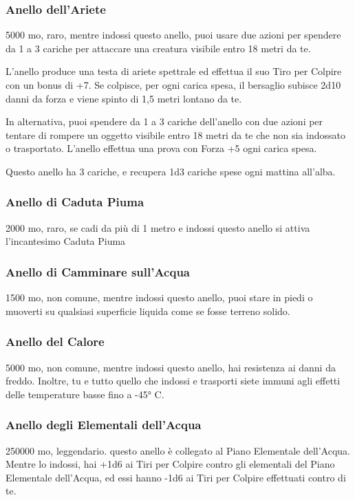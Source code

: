 \begin{multicols}{2}
	\subsubsection*{Anello dell'Ariete}
	5000 mo, raro, mentre indossi questo anello, puoi usare due azioni per spendere da 1 a 3 cariche per attaccare una creatura visibile entro 18 metri da te.

	L'anello produce una testa di ariete spettrale ed effettua il suo Tiro per Colpire con un bonus di +7. Se colpisce, per ogni carica spesa, il bersaglio subisce 2d10 danni da forza e viene spinto di 1,5 metri lontano da te.

	In alternativa, puoi spendere da 1 a 3 cariche dell'anello con due azioni per tentare di rompere un oggetto visibile entro 18 metri da te che non sia indossato o trasportato. L'anello effettua una prova con Forza +5 ogni carica spesa.

	Questo anello ha 3 cariche, e recupera 1d3 cariche spese ogni mattina all'alba.

	\subsubsection*{Anello di Caduta Piuma}
	2000 mo, raro, se cadi da più di 1 metro e indossi questo anello si attiva l'incantesimo Caduta Piuma

	\subsubsection*{Anello di Camminare sull'Acqua}
	1500 mo, non comune, mentre indossi questo anello, puoi stare in piedi o muoverti su qualsiasi superficie liquida come se fosse terreno solido.

	\subsubsection*{Anello del Calore}
	5000 mo, non comune, mentre indossi questo anello, hai resistenza ai danni da freddo. Inoltre, tu e tutto quello che indossi e trasporti siete immuni agli effetti delle temperature basse fino a -45° C.

	\subsubsection*{Anello degli Elementali dell'Acqua}
	250000 mo, leggendario. questo anello è collegato al Piano Elementale dell'Acqua. Mentre lo indossi, hai +1d6 ai Tiri per Colpire contro gli elementali del Piano Elementale dell'Acqua, ed essi hanno -1d6 ai Tiri per Colpire effettuati contro di te.


\end{multicols}
